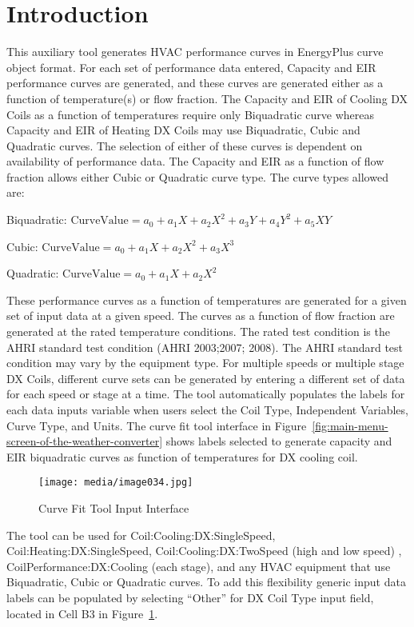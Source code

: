 \section{Introduction}\label{introduction-002}

This auxiliary tool generates HVAC performance curves in EnergyPlus curve object format. For each set of performance data entered, Capacity and EIR performance curves are generated, and these curves are generated either as a function of temperature(s) or flow fraction. The Capacity and EIR of Cooling DX Coils as a function of temperatures require only Biquadratic curve whereas Capacity and EIR of Heating DX Coils may use Biquadratic, Cubic and Quadratic curves. The selection of either of these curves is dependent on availability of performance data. The Capacity and EIR as a function of flow fraction allows either Cubic or Quadratic curve type. The curve types allowed are:

Biquadratic: \(\text{CurveValue} = a_0 + a_1 X + a_2 X^2 + a_3 Y + a_4 Y^2 + a_5 XY\)

Cubic: \(\text{CurveValue} = a_0 + a_1 X + a_2 X^2 + a_3 X^3\)

Quadratic: \(\text{CurveValue} = a_0 + a_1 X + a_2 X^2\)

These performance curves as a function of temperatures are generated for a given set of input data at a given speed. The curves as a function of flow fraction are generated at the rated temperature conditions. The rated test condition is the AHRI standard test condition (AHRI 2003;2007; 2008). The AHRI standard test condition may vary by the equipment type. For multiple speeds or multiple stage DX Coils, different curve sets can be generated by entering a different set of data for each speed or stage at a time. The tool automatically populates the labels for each data inputs variable when users select the Coil Type, Independent Variables, Curve Type, and Units. The curve fit tool interface in Figure~\ref{fig:main-menu-screen-of-the-weather-converter} shows labels selected to generate capacity and EIR biquadratic curves as function of temperatures for DX cooling coil.

\begin{figure}[hbtp] %
\centering
\texttt{[image: media/image034.jpg]}
\caption{Curve Fit Tool Input Interface \protect \label{fig:curve-fit-tool-input-interface}}
\end{figure}

The tool can be used for Coil:Cooling:DX:SingleSpeed, Coil:Heating:DX:SingleSpeed, Coil:Cooling:DX:TwoSpeed (high and low speed) , CoilPerformance:DX:Cooling (each stage), and any HVAC equipment that use Biquadratic, Cubic or Quadratic curves. To add this flexibility generic input data labels can be populated by selecting ``Other'' for DX Coil Type input field, located in Cell B3 in Figure~\ref{fig:curve-fit-tool-input-interface}.

